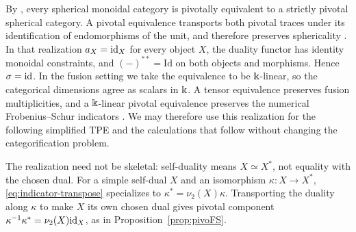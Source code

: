 \documentclass{amsart}
\begin{document}
\begin{remark} \label{rk:StrPiv}
By \cite[Definition~2.1 and Theorem~2.2, p.~70]{NgSch}, every spherical monoidal category is pivotally equivalent to a strictly pivotal spherical category. A pivotal equivalence transports both pivotal traces under its identification of endomorphisms of the unit, and therefore preserves sphericality \cite[Lemma~6.1, p.~78]{NgSch}. In that realization $a_X=\mathrm{id}_X$ for every object $X$, the duality functor has identity monoidal constraints, and $(-)^{**}=\mathrm{Id}$ on both objects and morphisms. Hence $\sigma=\mathrm{id}$. In the fusion setting we take the equivalence to be $\Bbbk$-linear, so the categorical dimensions agree as scalars in $\Bbbk$. A tensor equivalence preserves fusion multiplicities, and a $\Bbbk$-linear pivotal equivalence preserves the numerical Frobenius--Schur indicators \cite[Corollary~4.4, p.~74]{NgSch}. We may therefore use this realization for the following simplified TPE and the calculations that follow without changing the categorification problem.

The realization need not be skeletal: self-duality means $X\simeq X^*$, not equality with the chosen dual. For a simple self-dual $X$ and an isomorphism $\kappa:X\to X^*$, \eqref{eq:indicator-transpose} specializes to $\kappa^*=\nu_2(X)\kappa$. Transporting the duality along $\kappa$ to make $X$ its own chosen dual gives pivotal component $\kappa^{-1}\kappa^*=\nu_2(X)\mathrm{id}_X$, as in Proposition~\ref{prop:pivoFS}.
\end{remark}
\end{document}
